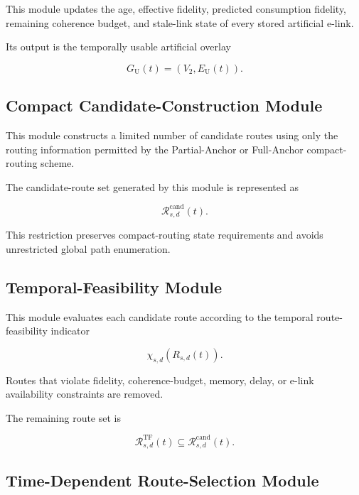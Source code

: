This module updates the age, effective fidelity, predicted consumption fidelity, remaining coherence budget, and stale-link state of every stored artificial e-link.

Its output is the temporally usable artificial overlay

\begin{equation}
    G_{\mathrm{U}}(t)
    =
    \left(
    V_2,
    E_{\mathrm{U}}(t)
    \right).
\end{equation}

\subsection{Compact Candidate-Construction Module}

This module constructs a limited number of candidate routes using only the routing information permitted by the Partial-Anchor or Full-Anchor compact-routing scheme.

The candidate-route set generated by this module is represented as

\begin{equation}
    \mathcal{R}_{s,d}^{\mathrm{cand}}(t).
\end{equation}

This restriction preserves compact-routing state requirements and avoids unrestricted global path enumeration.

\subsection{Temporal-Feasibility Module}

This module evaluates each candidate route according to the temporal route-feasibility indicator

\begin{equation}
    \chi_{s,d}
    \left(
    R_{s,d}(t)
    \right).
\end{equation}

Routes that violate fidelity, coherence-budget, memory, delay, or e-link availability constraints are removed.

The remaining route set is

\begin{equation}
    \mathcal{R}_{s,d}^{\mathrm{TF}}(t)
    \subseteq
    \mathcal{R}_{s,d}^{\mathrm{cand}}(t).
\end{equation}

\subsection{Time-Dependent Route-Selection Module}

